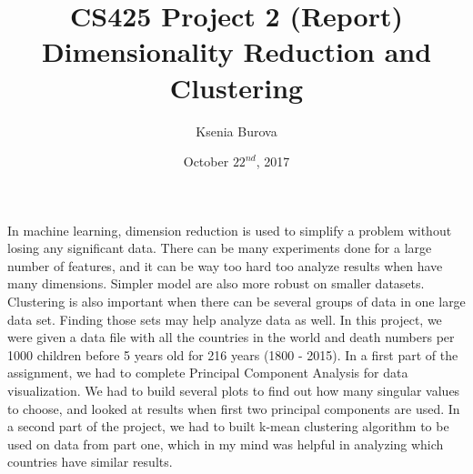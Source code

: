 \documentclass[12pt, letterpaper]{article}
\title{CS425 Project 2 (Report)\\Dimensionality Reduction and Clustering}
\author{Ksenia Burova}
\date{October \(22^{nd}\), 2017}
\begin{document}
\maketitle

 In machine learning, dimension reduction is used to simplify a problem without losing any significant data. There can be many experiments done for a large number of features, and it can be way too hard too analyze results when have many dimensions. Simpler model are also more robust on smaller datasets. Clustering is also important when there can be several groups of data in one large data set. Finding those sets may help analyze data as well. In this project, we were given a data file with all the countries in the world and death numbers per 1000 children before 5 years old for 216 years (1800 - 2015). In a first part of the assignment, we had to complete Principal Component Analysis for data visualization. We had to build several plots to find out how many singular values to choose, and looked at results when first two principal components are used.
In a second part of the project, we had to built k-mean clustering algorithm to be used on data from part one, which in my mind was helpful in analyzing which countries have similar results.\\
\end{document}
